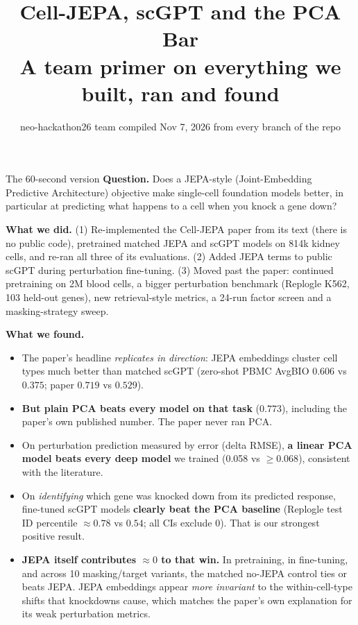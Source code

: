 \documentclass[11pt]{article}
\title{\textbf{Cell-JEPA, scGPT and the PCA Bar}\\[2pt]
\large A team primer on everything we built, ran and found}
\author{neo-hackathon26 team \quad\textbullet\quad compiled Nov 7, 2026 from every branch of the repo}
\date{}
\begin{document}
\maketitle
\vspace{-1.5em}

\begin{keybox}{The 60-second version}
\textbf{Question.} Does a JEPA-style (Joint-Embedding Predictive Architecture) objective make single-cell foundation models better, in particular at predicting what happens to a cell when you knock a gene down?

\textbf{What we did.} (1) Re-implemented the Cell-JEPA paper from its text (there is no public code), pretrained matched JEPA and scGPT models on 814k kidney cells, and re-ran all three of its evaluations. (2) Added JEPA terms to public scGPT during perturbation fine-tuning. (3) Moved past the paper: continued pretraining on 2M blood cells, a bigger perturbation benchmark (Replogle K562, 103 held-out genes), new retrieval-style metrics, a 24-run factor screen and a masking-strategy sweep.

\textbf{What we found.}
\begin{itemize}
\item The paper's headline \emph{replicates in direction}: JEPA embeddings cluster cell types much better than matched scGPT (zero-shot PBMC AvgBIO $0.606$ vs $0.375$; paper $0.719$ vs $0.529$).
\item \textbf{But plain PCA beats every model on that task} ($0.773$), including the paper's own published number. The paper never ran PCA.
\item On perturbation prediction measured by error (delta RMSE), \textbf{a linear PCA model beats every deep model} we trained (0.058 vs $\geq 0.068$), consistent with the literature.
\item On \emph{identifying} which gene was knocked down from its predicted response, fine-tuned scGPT models \textbf{clearly beat the PCA baseline} (Replogle test ID percentile $\approx 0.78$ vs $0.54$; all CIs exclude 0). That is our strongest positive result.
\item \textbf{JEPA itself contributes $\approx 0$ to that win.} In pretraining, in fine-tuning, and across 10 masking/target variants, the matched no-JEPA control ties or beats JEPA. JEPA embeddings appear \emph{more invariant} to the within-cell-type shifts that knockdowns cause, which matches the paper's own explanation for its weak perturbation metrics.
\end{itemize}
\end{keybox}
\end{document}
